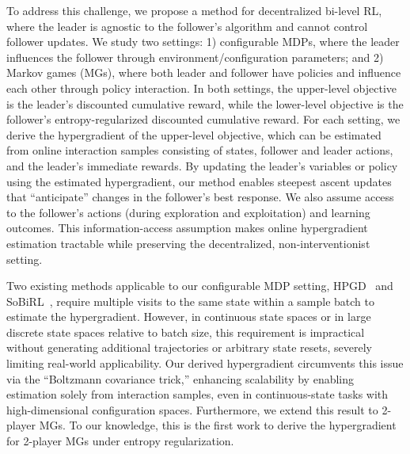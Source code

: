 \documentclass[letterpaper]{article} %
\begin{document}
To address this challenge, we propose a method for decentralized bi-level RL, where the leader is agnostic to the follower's algorithm and cannot control follower updates.
We study two settings: 1) configurable MDPs, where the leader influences the follower through environment/configuration parameters; and 2) Markov games (MGs), where both leader and follower have policies and influence each other through policy interaction.
In both settings, the upper-level objective is the leader's discounted cumulative reward, while the lower-level objective is the follower's entropy-regularized discounted cumulative reward.
For each setting, we derive the hypergradient of the upper-level objective, which can be estimated from online interaction samples consisting of states, follower and leader actions, and the leader's immediate rewards.
By updating the leader's variables or policy using the estimated hypergradient, our method enables steepest ascent updates that ``anticipate'' changes in the follower's best response.
We also assume access to the follower's actions (during exploration and exploitation) and learning outcomes.
This information-access assumption makes online hypergradient estimation tractable while preserving the decentralized, non-interventionist setting.

Two existing methods applicable to our configurable MDP setting, HPGD~\citep{Thoma2024-em} and SoBiRL~\citep{Yang2025-lr}, require multiple visits to the same state within a sample batch to estimate the hypergradient.
However, in continuous state spaces or in large discrete state spaces relative to batch size, this requirement is impractical without generating additional trajectories or arbitrary state resets, severely limiting real-world applicability.
Our derived hypergradient circumvents this issue via the ``Boltzmann covariance trick,'' enhancing scalability by enabling estimation solely from interaction samples, even in continuous-state tasks with high-dimensional configuration spaces.
Furthermore, we extend this result to 2-player MGs.
To our knowledge, this is the first work to derive the hypergradient for 2-player MGs under entropy regularization.
\end{document}
